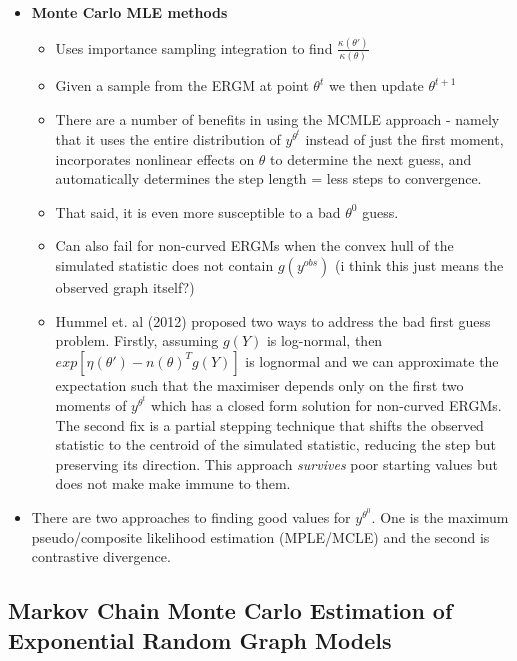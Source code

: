 \begin{itemize}
    \item \textbf{Monte Carlo MLE methods}
\begin{itemize}
    \item Uses importance sampling integration to find $\frac{\kappa(\theta')}{\kappa(\theta)}$
    \item Given a sample from the ERGM at point $\theta^{t}$ we then update $\theta^{t+1}$
    \item There are a number of benefits in using the MCMLE approach - namely that it uses the entire distribution of $y^{\theta^{t}}$ instead of just the first moment, incorporates nonlinear effects on $\theta$ to determine the next guess, and automatically determines the step length = less steps to convergence.
    \item That said, it is even more susceptible to a bad $\theta^{0}$ guess.
    \item Can also fail for non-curved ERGMs when the convex hull of the simulated statistic does not contain $g(y^{obs})$ (i think this just means the observed graph itself?)
    \item Hummel et. al (2012) proposed two ways to address the bad first guess problem. Firstly, assuming $g(Y)$ is log-normal, then $exp[{\eta(\theta') - n(\theta)}^{T}g(Y)]$ is lognormal and we can approximate the expectation such that the maximiser depends only on the first two moments of $y^{\theta^{t}}$ which has a closed form solution for non-curved ERGMs. The second fix is a partial stepping technique that shifts the observed statistic to the centroid of the simulated statistic, reducing the step but preserving its direction. This approach \emph{survives} poor starting values but does not make make immune to them.
\end{itemize}
    \item There are two approaches to finding good values for $y^{\theta^{0}}$. One is the maximum pseudo/composite likelihood estimation (MPLE/MCLE) and the second is contrastive divergence. 
\end{itemize}


\subsection{Markov Chain Monte Carlo Estimation of Exponential Random Graph Models}

